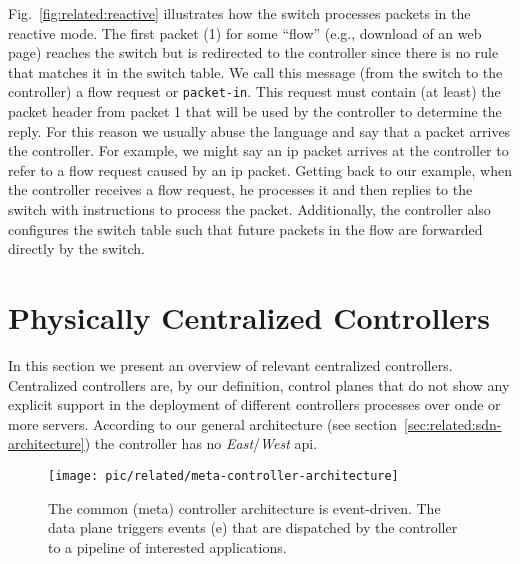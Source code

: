 Fig.~\ref{fig:related:reactive} illustrates how the switch processes packets in the reactive mode. 
The first packet (1) for some ``flow'' (e.g., download of an web page)  reaches the switch but is redirected to the controller since there is no rule that matches it in  the switch table. 
We call this message (from the switch to the controller)  a flow request or \texttt{packet-in}. 
This request must contain (at least) the packet header from packet 1 that will be used by the controller to determine the reply. 
For this reason we usually abuse the language and say that a packet arrives the controller. 
For example, we might say an \gls{ip} packet arrives at the controller to refer to a flow request caused by an \gls{ip} packet. 
Getting back to our example, when the controller receives a flow request, he processes it  and then replies to the switch with instructions to process the packet. 
Additionally, the controller also configures the switch table such that  future packets in the flow are forwarded directly by the switch. 



\glsresetall

\section{Physically Centralized Controllers}
\label{sec:related:phys-centr-contr}
\glsresetall


In this section we present an overview of relevant centralized
controllers. Centralized controllers are, by our definition, control
planes that do not show any explicit support in the deployment of 
different controllers processes over onde or more servers. 
According to our general architecture (see section~\ref{sec:related:sdn-architecture}) the controller has no \emph{East}/\emph{West} \gls{api}. 


\begin{figure}
  \centering
\texttt{[image: pic/related/meta-controller-architecture]}
  \caption[Controller Architecture]{The common (meta) controller architecture is event-driven. The data plane triggers events (e) that are dispatched by the controller to a pipeline of interested applications. }
\label{fig:related:meta-architecture}
\end{figure}

